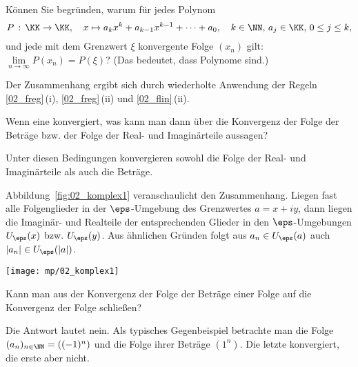\begin{frage}%
  Können Sie begründen, warum für jedes Polynom 
  \[
  P\,:\, \KK\to \KK, \quad
  x \mapsto a_kx^k+a_{k-1}x^{k-1}+\cdots + a_0, \quad
  k\in\NN,\,a_j \in\KK,\, 0\le j\le k,
  \]
  und jede mit dem Grenzwert $\xi$ konvergente Folge $(x_n)$ gilt: 
  $\lim\limits_{n\to\infty} P(x_n) = P( \xi )$? (Das bedeutet, dass Polynome 
   sind.)
\end{frage}

\begin{antwort}
  Der Zusammenhang ergibt sich durch wiederholte Anwendung der Regeln 
  \ref{02_freg}\,(i), 
  \ref{02_freg}\,(ii) und 
  \ref{02_flin}\,(ii). 
  \AntEnd
\end{antwort}

\begin{frage}%
  \label{02_fkom}
  Wenn eine  konvergiert, was kann man dann 
  über die Konvergenz der Folge der Beträge bzw. der Folge der Real- und 
  Imaginärteile aussagen?
\end{frage}

\begin{antwort}
  Unter diesen Bedingungen konvergieren sowohl 
  die Folge der Real- und Imaginärteile als auch die Beträge. 

  Abbildung~\ref{fig:02_komplex1} veranschaulicht den Zusammenhang. Liegen 
  fast alle Folgenglieder in der $\eps$-Umgebung des Grenzwertes 
  $a=x+iy$, dann 
  liegen die Imaginär- und Realteile der entsprechenden Glieder 
  in den  $\eps$-Umgebungen 
  $U_\eps(x)$ bzw. 
  $U_\eps(y)$. Aus ähnlichen Gründen folgt aus 
  $a_n \in U_\eps(a)$ auch $|a_n| \in U_\eps( |a| )$.\AntEnd

  \begin{center}
    \texttt{[image: mp/02\_komplex1]}
    \label{fig:02_komplex1}
  \end{center}
\end{antwort}

\begin{frage}%
  \label{02_fbet}
  Kann man aus der Konvergenz der Folge der Beträge einer Folge auf die 
  Konvergenz der Folge schließen?
\end{frage}

\begin{antwort}
  Die Antwort lautet nein. Als typisches Gegenbeispiel betrachte man die 
  Folge $(a_n)_{n\in\NN}=((-1)^n)$ und die Folge ihrer Beträge $(1^n)$. Die 
  letzte konvergiert, die erste aber nicht.
  \AntEnd
\end{antwort}

